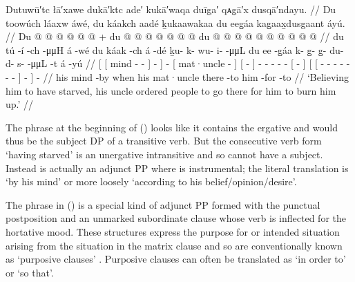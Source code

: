 \ex\label{ex:90-52-sent-people-to-burn-him}%
%
\begingl
	\glpreamble	Dutuwū′tc łā′xawe dukā′ktc ade′ kukā′waqa duīg̣a′ qᴀg̣ā′x dusqā′ndayu. //
	\glpreamble	Du toowúch láaxw áwé, du káakch aadé ḵukaawakaa du eeg̱áa kag̱aax̱dusgaant áyú. //
	\gla	{} {} Du  @ {} @ {} {}
			 @ {} @ {} @ {} {}  @ {} +
		{} du  @ {} {}
		{}  @ {} {}
		 @ {} @ {} @ {} @ {} @ {}
		{} du  @ {} {}
		{} {}  @ {} @ {} @ {} @ {} @ {} @ {} @ {} @ {} {} {} {} 
		 @ {} //
	\glb	{} {} du tú -í -ch {}
			{}  -μμH {} {} á -wé
		{} du káak -ch {}
		{} á -dé {}
		ḵu- k- wu- i-  -μμL
		{} du ee -g̱áa {}
		{} {} k- g̱- g̱- du- d- s-  -μμL {} {} -t {}
		á -yú //
	\glc	{}[ {}[  mind - - {}]
			\·  - \· {}]  -
		{}[  mat·uncle - {}]
		{}[  - {}]
		- - - -  -
		{}[   - {}]
		{}[ {}[
			- - - - - -
				 - \· {}] - {}]
		 - //
	\gld	{} {} his mind {} -by {}
			 {} {} \·when {}  {}
		{} his mat·uncle {} {}
		{} there -to {}
		 {} {} {} {} {}
		{} him {} -for {}
		{} {}  {} {} {} {} {} {} {} {} {} -to {}
		 {} //
	\glft	‘Believing him to have starved, his uncle ordered people to go there for him to burn him up.’
		//
\endgl
\xe

The phrase  at the beginning of (\lastx) looks like it contains the ergative  and would thus be the subject DP of a transitive verb.
But the consecutive verb form  ‘having starved’ is an unergative intransitive and so cannot have a subject.
Instead  is actually an adjunct PP where  is instrumental; the literal translation is ‘by his mind’ or more loosely ‘according to his belief/opinion/desire’.

The phrase  in (\lastx) is a special kind of adjunct PP formed with the punctual postposition  and an unmarked subordinate clause whose verb is inflected for the hortative mood.
These structures express the purpose for or intended situation arising from the situation in the matrix clause and so are conventionally known as ‘purposive clauses’ \parencites[91–92]{naish:1966}[106, 187]{story:1966}[427–428]{leer:1991}.
Purposive clauses can often be translated as ‘in order to’ or ‘so that’.

